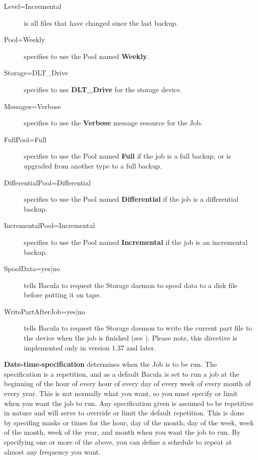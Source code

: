 \begin{description}
\begin{description}
\item [Level=Incremental]
   is all files that have changed since  the last backup.  

\item [Pool=Weekly]
   specifies to use the Pool named {\bf Weekly}.  

\item [Storage=DLT\_Drive]
   specifies to use {\bf DLT\_Drive} for  the storage device.  

\item [Messages=Verbose]
   specifies to use the {\bf Verbose}  message resource for the Job.  

\item [FullPool=Full]
   specifies to use the Pool named {\bf Full}  if the job is a full backup, or is
upgraded from another type  to a full backup.  

\item [DifferentialPool=Differential]
   specifies to use the Pool  named {\bf Differential} if the job is a
differential  backup.  

\item [IncrementalPool=Incremental]
   specifies to use the Pool  named {\bf Incremental} if the job is an
incremental  backup.  

\item [SpoolData=yes|no]
   tells Bacula to request the Storage  daemon to spool data to a disk file
before putting it on  tape.  

\item [WritePartAfterJob=yes|no]
   tells Bacula to request the Storage  daemon to write the current part file to
   the device when the job  is finished (see 
   ). Please note, this directive is implemented 
   only in version 1.37 and later.

\end{description}

{\bf Date-time-specification} determines when the  Job is to be run. The
specification is a repetition, and as  a default Bacula is set to run a job at
the beginning of the  hour of every hour of every day of every week of every
month  of every year. This is not normally what you want, so you  must specify
or limit when you want the job to run. Any  specification given is assumed to
be repetitive in nature and  will serve to override or limit the default
repetition. This  is done by specifing masks or times for the hour, day of the
month, day of the week, week of the month, week of the year,  and month when
you want the job to run. By specifying one or  more of the above, you can
define a schedule to repeat at  almost any frequency you want.  


\end{description}
